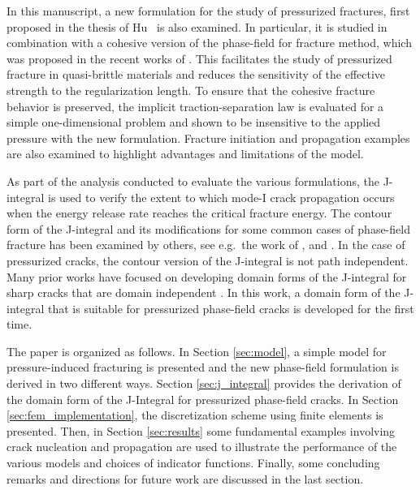 In this manuscript, a new formulation for the study of pressurized fractures, first proposed in the thesis of Hu~\cite{hu2021variationalthesis} is also examined. In particular, it is studied in combination with a cohesive version of the phase-field for fracture method, which was proposed in the recent works of \cite{lorentz2011convergence, geelen2019phase, wu2017unified}.  This facilitates the study of pressurized fracture in quasi-brittle materials and reduces the sensitivity of the effective strength to the regularization length. To ensure that the cohesive fracture behavior is preserved, the implicit traction-separation law is evaluated for a simple one-dimensional problem and shown to be insensitive to the applied pressure with the new formulation. Fracture initiation and propagation examples are also examined to highlight advantages and limitations of the model. 

As part of the analysis conducted to evaluate the various formulations, the J-integral is used to verify the extent to which mode-I crack propagation occurs when the energy release rate reaches the critical fracture energy.  
The contour form of the J-integral and its modifications for some common cases of phase-field fracture has been examined by others, see e.g.\ the work of \cite{sicsic2013gradient}, \cite{ballarini2016closed} and \cite{hossain2014effective}.  In the case of pressurized cracks, the contour version of the J-integral is not path independent. Many prior works have focused on developing domain forms of the J-integral for sharp cracks that are domain independent \cite{li1985comparison, shih1986energy}.  In this work, a domain form of the J-integral that is suitable for pressurized phase-field cracks is developed for the first time.  

The paper is organized as follows. In Section \ref{sec:model}, a simple model for pressure-induced fracturing is presented and the new phase-field formulation is derived in two different ways.  Section \ref{sec:j_integral} provides the derivation of the domain form of the J-Integral for pressurized phase-field cracks. In Section \ref{sec:fem_implementation}, the discretization scheme using finite elements is presented. Then, in Section \ref{sec:results} some fundamental examples involving crack nucleation and propagation are used to illustrate the performance of the various models and choices of indicator functions. Finally, some concluding remarks and directions for future work are discussed in the last section.

